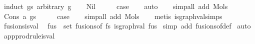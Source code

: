 \begin{isabellebody}
%
\endisadelimproof
%
\isatagproof
{}\isamarkupfalse%
\ {\isacharparenleft}{\kern0pt}induct\ gs\ arbitrary{\isacharcolon}{\kern0pt}\ g{\isacharparenright}{\kern0pt}\isanewline
\ \ \isamarkupfalse%
\ Nil\isanewline
\ \ \isamarkupfalse%
\ \isamarkupfalse%
\ {\isacharquery}{\kern0pt}case\isanewline
\ \ \isamarkupfalse%
\ auto\isanewline
\ \ \isamarkupfalse%
\ {\isacharparenleft}{\kern0pt}simp{\isacharunderscore}{\kern0pt}all\ add{\isacharcolon}{\kern0pt}\ Mols{}{\isacharparenright}{\kern0pt}\isanewline
\ \ \isamarkupfalse%
\isanewline
{}\isamarkupfalse%
\isanewline
\ \ \isamarkupfalse%
\ {\isacharparenleft}{\kern0pt}Cons\ a\ gs{\isacharparenright}{\kern0pt}\isanewline
\ \ \isamarkupfalse%
\ \isamarkupfalse%
\ {\isacharquery}{\kern0pt}case\isanewline
\ \ \isamarkupfalse%
\ {\isacharparenleft}{\kern0pt}simp{\isacharunderscore}{\kern0pt}all\ add{\isacharcolon}{\kern0pt}\ Mols{}{\isacharparenright}{\kern0pt}\isanewline
\ \ \isamarkupfalse%
\ {\isacharparenleft}{\kern0pt}metis\ is{\isacharunderscore}{\kern0pt}graph{\isacharunderscore}{\kern0pt}val{\isachardot}{\kern0pt}simps{\isacharparenleft}{\kern0pt}{}{\isacharparenright}{\kern0pt}{\isacharparenright}{\kern0pt}\isanewline
{}\isamarkupfalse%
%
\endisatagproof
{\isafoldproof}%
%
\isadelimproof
\isanewline
%
\endisadelimproof
\isanewline
\isanewline
{}\isamarkupfalse%
\ fusions{\isacharunderscore}{\kern0pt}is{\isacharunderscore}{\kern0pt}val{\isacharcolon}{\kern0pt}\isanewline
\ \ {\isachardoublequoteopen}{\isasymforall}fus\ {\isasymin}\ set\ {\isacharparenleft}{\kern0pt}fusions{\isacharunderscore}{\kern0pt}of\ fs{\isacharparenright}{\kern0pt}{\isachardot}{\kern0pt}\ is{\isacharunderscore}{\kern0pt}graph{\isacharunderscore}{\kern0pt}val\ fus{\isachardoublequoteclose}\isanewline
%
\isadelimproof
%
\endisadelimproof
%
\isatagproof
{}\isamarkupfalse%
\ {\isacharparenleft}{\kern0pt}simp\ add{\isacharcolon}{\kern0pt}\ fusions{\isacharunderscore}{\kern0pt}of{\isacharunderscore}{\kern0pt}def{\isacharparenright}{\kern0pt}\isanewline
{}\isamarkupfalse%
\ auto%
\endisatagproof
{\isafoldproof}%
%
\isadelimproof
\isanewline
%
\endisadelimproof
\isanewline
\isanewline
{}\isamarkupfalse%
\ app{\isacharunderscore}{\kern0pt}prodrule{\isacharunderscore}{\kern0pt}is{\isacharunderscore}{\kern0pt}val{\isacharcolon}{\kern0pt}\isanewline

\end{isabellebody}
